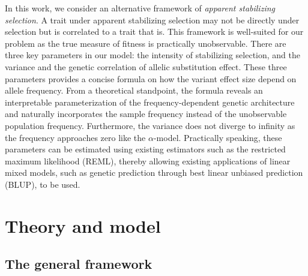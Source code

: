 \documentclass[10pt]{article}
\begin{document}
In this work, we consider an alternative framework of \emph{apparent stabilizing selection}.
A trait under apparent stabilizing selection may not be directly under selection but is correlated to a trait that is. 
This framework is well-suited for our problem as the true measure of fitness is practically unobservable.
There are three key parameters in our model: the intensity of stabilizing selection, 
and the variance and the genetic correlation of allelic substitution effect.
These three parameters provides a concise formula on how the variant effect size depend on allele frequency.
From a theoretical standpoint, the formula reveals an interpretable parameterization of the frequency-dependent genetic architecture and naturally incorporates the sample frequency instead of the unobservable population frequency.
Furthermore, the variance does not diverge to infinity as the frequency approaches zero like the $\alpha$-model.
Practically speaking, these parameters can be estimated using existing estimators such as the restricted maximum likelihood (REML), 
thereby allowing existing applications of linear mixed models, such as genetic prediction through best linear unbiased prediction (BLUP), to be used.




\section{Theory and model}

\subsection{The general framework}
\end{document}
